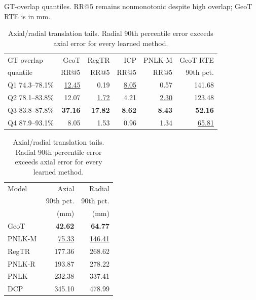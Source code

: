\documentclass{bmvc2k}
\newcommand{\best}[1]{\textbf{#1}}
\newcommand{\second}[1]{\underline{#1}}
\begin{document}
\begin{table}[t]
\centering
\begin{minipage}[t]{0.49\textwidth}
\centering
\caption{GT-overlap quantiles. RR@5 remains nonmonotonic despite high overlap; GeoT RTE is in mm.}
\label{tab:overlap_quantiles}
\scriptsize
\setlength{\tabcolsep}{1.5pt}
\begin{tabular}{@{}lrrrrr@{}}
\hline
GT overlap & \shortstack{GeoT\\[-0.15em]\cite{qin2022geometric}} & \shortstack{RegTR\\[-0.15em]\cite{yew2022regtr}} & \shortstack{ICP\\[-0.15em]\cite{besl1992method}} & PNLK-M & GeoT RTE \\
quantile & RR@5 & RR@5 & RR@5 & RR@5 & 90th pct. \\
\hline
Q1 74.3--78.1\% & \second{12.45} & 0.19 & \second{8.05} & 0.57 & 141.68 \\
Q2 78.1--83.8\% & 12.07 & \second{1.72} & 4.21 & \second{2.30} & 123.48 \\
Q3 83.8--87.8\% & \best{37.16} & \best{17.82} & \best{8.62} & \best{8.43} & \best{52.16} \\
Q4 87.9--93.1\% & 8.05 & 1.53 & 0.96 & 1.34 & \second{65.81} \\
\hline
\end{tabular}
\end{minipage}
\hfill
\begin{minipage}[t]{0.49\textwidth}
\centering
\caption{Axial/radial translation tails. Radial 90th percentile error exceeds axial error for every learned method.}
\label{tab:axial_radial}
\scriptsize
\setlength{\tabcolsep}{4.2pt}
\begin{tabular}{lrr}
\hline
Model & Axial & Radial \\
 & 90th pct. & 90th pct. \\
 & (mm) & (mm) \\
\hline
GeoT~\cite{qin2022geometric} & \best{42.62} & \best{64.77} \\
PNLK-M & \second{75.33} & \second{146.41} \\
RegTR~\cite{yew2022regtr} & 177.36 & 268.62 \\
PNLK-R~\cite{li2021pointnetlk} & 193.87 & 278.22 \\
PNLK~\cite{aoki2019pointnetlk} & 232.38 & 337.41 \\
DCP~\cite{wang2019deep} & 345.10 & 478.99 \\
\hline
\end{tabular}
\end{minipage}
\end{table}
\end{document}
